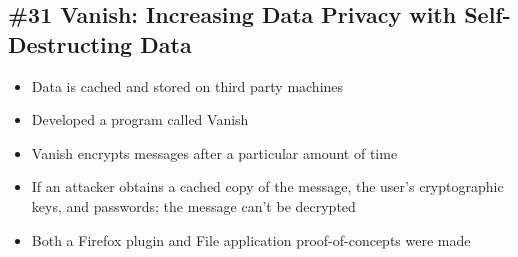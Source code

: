 \subsection{\#31 Vanish: Increasing Data Privacy with Self-Destructing Data}
\begin{itemize}
	\item Data is cached and stored on third party machines
	\item Developed a program called Vanish
	\item Vanish encrypts messages after a particular amount of time
	\item If an attacker obtains a cached copy of the message, the user's cryptographic keys, and passwords; the message can't be decrypted
	\item Both a Firefox plugin and File application proof-of-concepts were made
\end{itemize}